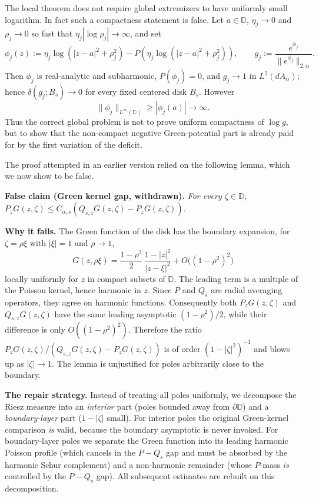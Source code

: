 \documentclass[a4paper,10pt]{amsart}
\newcommand{\D}{\mathbb{D}}
\begin{document}
The local theorem does not require global extremizers to have uniformly small
logarithm. In fact such a compactness statement is false. Let
$a\in\D$, $\eta_j\to0$ and $\rho_j\to0$ so fast that
$\eta_j|\log\rho_j|\to\infty$, and set
\[
\phi_j(z)
:=
\eta_j\log(|z-a|^2+\rho_j^2)-P\!\left(\eta_j\log(|z-a|^2+\rho_j^2)\right),
\qquad
g_j:=\frac{e^{\phi_j}}{\|e^{\phi_j}\|_{2,\alpha}}.
\]
Then $\phi_j$ is real-analytic and subharmonic, $P(\phi_j)=0$, and
$g_j\to1$ in $L^2(dA_\alpha)$; hence $\delta(g_j;B_s)\to0$ for every fixed
centered disk $B_s$. However
\[
\|\phi_j\|_{L^\infty(\D)}\ge |\phi_j(a)|\to\infty.
\]
Thus the correct global problem is not to prove uniform compactness of
$\log g$, but to show that the non-compact negative Green-potential part is
already paid for by the first variation of the deficit.

The proof attempted in an earlier version relied on the following lemma,
which we now show to be false.

\medskip
\noindent\textbf{False claim (Green kernel gap, withdrawn).}
{\itshape
For every $\zeta\in\D$,
$P_zG(z,\zeta)\le C_{\alpha,s}(Q_{s,z}G(z,\zeta)-P_zG(z,\zeta))$.
}

\medskip
\noindent\textbf{Why it fails.}
The Green function of the disk has the boundary expansion, for
$\zeta=\rho\xi$ with $|\xi|=1$ and $\rho\to1$,
\[
G(z,\rho\xi)
=
\frac{1-\rho^2}{2}\,
\frac{1-|z|^2}{|z-\xi|^2}
+O\bigl((1-\rho^2)^2\bigr)
\]
locally uniformly for $z$ in compact subsets of $\D$.
The leading term is a multiple of the Poisson kernel, hence harmonic in $z$.
Since $P$ and $Q_s$ are radial averaging operators, they agree on harmonic
functions. Consequently both $P_zG(z,\zeta)$ and $Q_{s,z}G(z,\zeta)$ have the
same leading asymptotic $(1-\rho^2)/2$, while their difference is only
$O((1-\rho^2)^2)$. Therefore the ratio
$P_zG(z,\zeta)/(Q_{s,z}G(z,\zeta)-P_zG(z,\zeta))$ is of order
$(1-|\zeta|^2)^{-1}$ and blows up as $|\zeta|\to1$.
The lemma is unjustified for poles arbitrarily close to the boundary.

\medskip
\noindent\textbf{The repair strategy.}
Instead of treating all poles uniformly, we decompose the Riesz measure into
an \emph{interior} part (poles bounded away from $\partial\D$) and a
\emph{boundary-layer} part ($1-|\zeta|$ small).  For interior poles the
original Green-kernel comparison \emph{is} valid, because the boundary
asymptotic is never invoked.  For boundary-layer poles we separate the Green
function into its leading harmonic Poisson profile (which cancels in the
$P-Q_s$ gap and must be absorbed by the harmonic Schur complement) and a
non-harmonic remainder (whose $P$-mass \emph{is} controlled by the
$P-Q_s$ gap).  All subsequent estimates are rebuilt on this decomposition.
\end{document}
